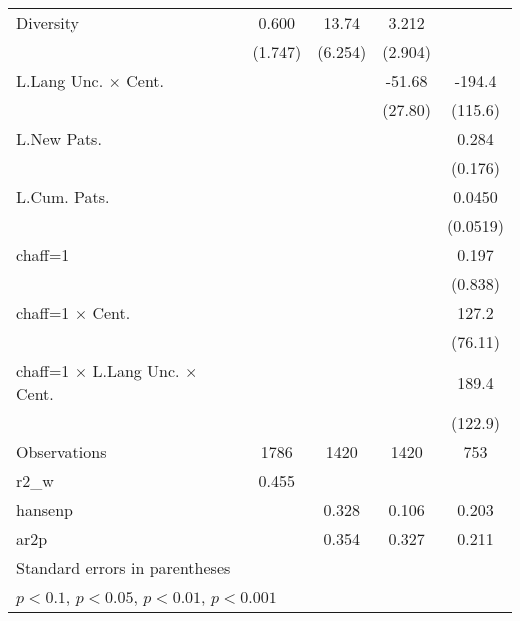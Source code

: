 {\begin{tabular}{l*{4}{c}}
Diversity           &       0.600         &       13.74\sym{*}  &       3.212         &                     \\
                    &     (1.747)         &     (6.254)         &     (2.904)         &                     \\
L.Lang Unc. $\times$ Cent.&                     &                     &      -51.68\sym{+}  &      -194.4\sym{+}  \\
                    &                     &                     &     (27.80)         &     (115.6)         \\
L.New Pats.         &                     &                     &                     &       0.284         \\
                    &                     &                     &                     &     (0.176)         \\
L.Cum. Pats.        &                     &                     &                     &      0.0450         \\
                    &                     &                     &                     &    (0.0519)         \\
chaff=1             &                     &                     &                     &       0.197         \\
                    &                     &                     &                     &     (0.838)         \\
chaff=1 $\times$ Cent.&                     &                     &                     &       127.2\sym{+}  \\
                    &                     &                     &                     &     (76.11)         \\
chaff=1 $\times$ L.Lang Unc. $\times$ Cent.&                     &                     &                     &       189.4         \\
                    &                     &                     &                     &     (122.9)         \\
\hline
Observations        &        1786         &        1420         &        1420         &         753         \\
r2\_w                &       0.455         &                     &                     &                     \\
hansenp             &                     &       0.328         &       0.106         &       0.203         \\
ar2p                &                     &       0.354         &       0.327         &       0.211         \\
\hline\hline
\multicolumn{5}{l}{\footnotesize Standard errors in parentheses}\\
\multicolumn{5}{l}{\footnotesize \sym{+} \(p<0.1\), \sym{*} \(p<0.05\), \sym{**} \(p<0.01\), \sym{***} \(p<0.001\)}\\
\end{tabular}
}
